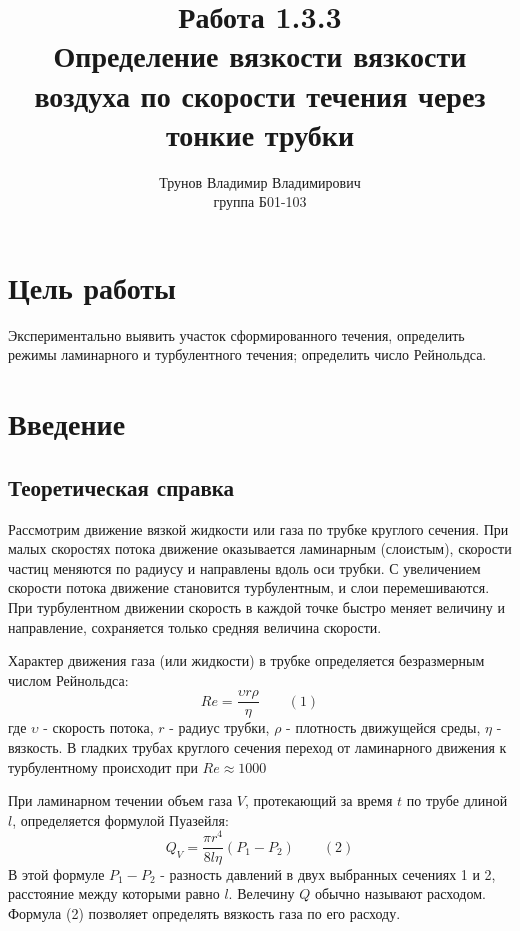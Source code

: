 \documentclass[a4paper, 12pt]{article}%
\author{Трунов Владимир Владимирович \\
группа Б01-103}
\title{\textbf{Работа 1.3.3 \\ Определение вязкости вязкости воздуха по скорости течения через тонкие трубки}}
\begin{document}
\maketitle
\newpage
\section*{Цель работы} Экспериментально выявить участок сформированного течения, определить режимы ламинарного и турбулентного течения; определить число Рейнольдса.
\section*{Введение}
\subsection*{Теоретическая справка}
Рассмотрим движение вязкой жидкости или газа по трубке круглого сечения. При малых скоростях потока движение оказывается ламинарным (слоистым), скорости частиц меняются по радиусу и направлены вдоль оси трубки. С увеличением скорости потока движение становится турбулентным, и слои перемешиваются. При турбулентном движении скорость в каждой точке быстро меняет величину и направление, сохраняется только средняя величина скорости.

Характер движения газа (или жидкости) в трубке определяется безразмерным числом Рейнольдса:
\[Re = \dfrac{\upsilon r \rho}{\eta} \text{  } \text{  } \text{  }(1)\]
где $\upsilon$ - скорость потока, $r$ - радиус трубки, $\rho$ - плотность движущейся среды, $\eta$ - вязкость. В гладких трубах круглого сечения переход от ламинарного движения к турбулентному происходит при $Re \approx 1000$

При ламинарном течении объем газа $V$, протекающий за время $t$ по трубе длиной $l$, определяется формулой Пуазейля:
\[Q_V = \dfrac{\pi r^4}{8 l \eta}(P_1 - P_2) \text{  } \text{  } \text{  }(2)\]
В этой формуле $P_1 - P_2$ - разность давлений в двух выбранных сечениях 1 и 2, расстояние между которыми равно $l$. Велечину $Q$ обычно называют расходом. Формула (2) позволяет определять вязкость газа по его расходу.
\end{document}
